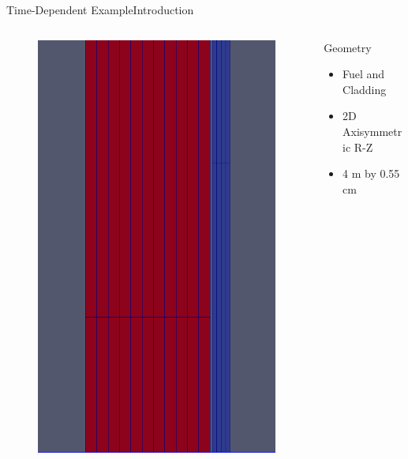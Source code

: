 \documentclass{beamer}
\begin{document}
\begin{frame}{Time-Dependent Example}{Introduction}\vspace{-20pt}
      \vfill
  \begin{columns}
    \begin{column}{0.5\textwidth}
      \vfill
      \begin{figure}
        \centering
        \includegraphics[width=0.8\linewidth]{oecd/mesh}
      \end{figure}
      \vfill
    \end{column}
    \begin{column}{0.5\textwidth}
      Geometry
      \vfill
      \begin{itemize}
        \item Fuel and Cladding
      \vfill
        \item 2D Axisymmetric R-Z
      \vfill
        \item 4 m by 0.55 cm

\end{itemize}
\end{column}
\end{columns}
\end{frame}
\end{document}
